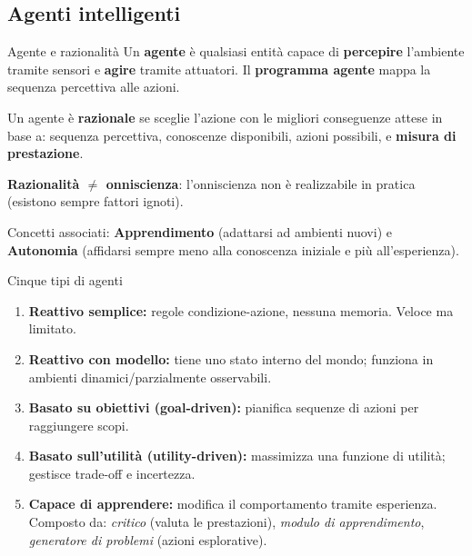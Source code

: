 \documentclass[12pt,a4paper]{article}
\begin{document}
\subsection{Agenti intelligenti}

\begin{defbox}{Agente e razionalità}
Un \textbf{agente} è qualsiasi entità capace di \textbf{percepire} l'ambiente tramite sensori e \textbf{agire} tramite attuatori. Il \textbf{programma agente} mappa la sequenza percettiva alle azioni.

Un agente è \textbf{razionale} se sceglie l'azione con le migliori conseguenze attese in base a: sequenza percettiva, conoscenze disponibili, azioni possibili, e \textbf{misura di prestazione}.

\textbf{Razionalità $\neq$ onniscienza}: l'onniscienza non è realizzabile in pratica (esistono sempre fattori ignoti).

Concetti associati: \textbf{Apprendimento} (adattarsi ad ambienti nuovi) e \textbf{Autonomia} (affidarsi sempre meno alla conoscenza iniziale e più all'esperienza).
\end{defbox}

\begin{defbox}{Cinque tipi di agenti}
\begin{enumerate}[noitemsep]
  \item \textbf{Reattivo semplice:} regole condizione-azione, nessuna memoria. Veloce ma limitato.
  \item \textbf{Reattivo con modello:} tiene uno stato interno del mondo; funziona in ambienti dinamici/parzialmente osservabili.
  \item \textbf{Basato su obiettivi (goal-driven):} pianifica sequenze di azioni per raggiungere scopi.
  \item \textbf{Basato sull'utilità (utility-driven):} massimizza una funzione di utilità; gestisce trade-off e incertezza.
  \item \textbf{Capace di apprendere:} modifica il comportamento tramite esperienza. Composto da: \emph{critico} (valuta le prestazioni), \emph{modulo di apprendimento}, \emph{generatore di problemi} (azioni esplorative).
\end{enumerate}
\end{defbox}
\end{document}

